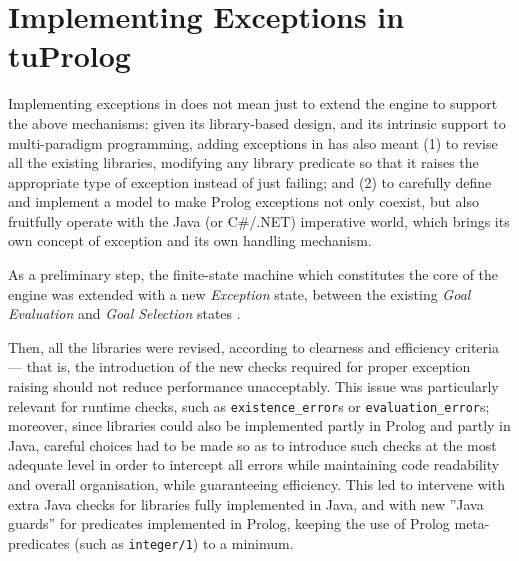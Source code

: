 \section{Implementing Exceptions in tuProlog}
\label{sec:implementing exceptions in tuprolog}
Implementing exceptions in \tuprolog{} does not mean just to extend the engine to support the
above mechanisms: given its library-based design, and its intrinsic support to multi-paradigm
programming, adding exceptions in \tuprolog{} has also meant (1) to revise all the existing
libraries, modifying any library predicate so that it raises the appropriate type of exception
instead of just failing; and (2) to carefully define and implement a model to make Prolog
exceptions not only coexist, but also fruitfully operate with the Java (or C\#/.NET) imperative
world, which brings its own concept of exception and its own handling mechanism.

As a preliminary step, the finite-state machine which constitutes the core of the \tuprolog{}
engine was extended with a new \textit{Exception} state, between the existing \textit{Goal
Evaluation} and \textit{Goal Selection} states \cite{iuliani-masterthesis-2009}.

Then, all the \tuprolog{} libraries were revised, according to clearness and efficiency criteria
--- that is, the introduction of the new checks required for proper exception raising should not
reduce performance unacceptably. This issue was particularly relevant for runtime checks, such as
\texttt{existence\_error}s or \texttt{evaluation\_error}s; moreover, since \tuprolog{} libraries
could also be implemented partly in Prolog and partly in Java, careful choices had to be made so
as to introduce such checks at the most adequate level in order to intercept all errors while
maintaining code readability and overall organisation, while guaranteeing efficiency. This led to
intervene with extra Java checks for libraries fully implemented in Java, and with new ''Java
guards'' for predicates implemented in Prolog, keeping the use of Prolog meta-predicates (such as
\texttt{integer/1}) to a minimum.

